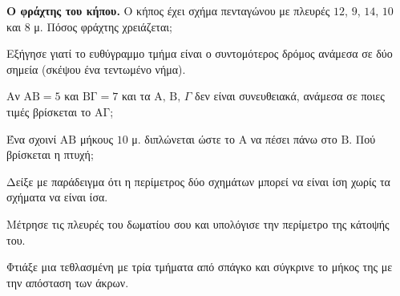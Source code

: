 \ex \textbf{Ο φράχτης του κήπου.} Ο κήπος έχει σχήμα πενταγώνου με πλευρές $12$, $9$, $14$, $10$ και $8$ μ. Πόσος φράχτης χρειάζεται;


\ex Εξήγησε γιατί το ευθύγραμμο τμήμα είναι ο συντομότερος δρόμος ανάμεσα σε δύο σημεία (σκέψου ένα τεντωμένο νήμα).

\ex Αν $\mathrm{ΑΒ}=5$ και $\mathrm{ΒΓ}=7$ και τα $\mathrm{Α},\,\mathrm{Β},\,\Gamma$ δεν είναι συνευθειακά, ανάμεσα σε ποιες τιμές βρίσκεται το $\mathrm{ΑΓ}$;

\ex Ένα σχοινί $\mathrm{ΑΒ}$ μήκους $10$ μ. διπλώνεται ώστε το $\mathrm{Α}$ να πέσει πάνω στο $\mathrm{Β}$. Πού βρίσκεται η πτυχή;

\ex Δείξε με παράδειγμα ότι η περίμετρος δύο σχημάτων μπορεί να είναι ίση χωρίς τα σχήματα να είναι ίσα.


\ex Μέτρησε τις πλευρές του δωματίου σου και υπολόγισε την περίμετρο της κάτοψής του.

\ex Φτιάξε μια τεθλασμένη με τρία τμήματα από σπάγκο και σύγκρινε το μήκος της με την απόσταση των άκρων.
